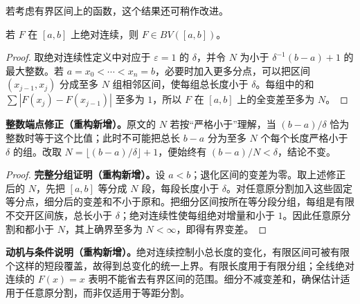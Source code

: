 \documentclass[../../main.tex]{subfiles}%
\begin{document}
若考虑有界区间上的函数，这个结果还可稍作改进。
\begin{lemma}\label{lemma:ch03-ac-implies-bv}
若 $F$ 在 $[a,b]$ 上绝对连续，则 $F\in BV([a,b])$。
\end{lemma}
\begin{proof}
取绝对连续性定义中对应于 $\varepsilon=1$ 的 $\delta$，并令 $N$ 为小于 $\delta^{-1}(b-a)+1$ 的最大整数。若 $a=x_0<\cdots<x_n=b$，必要时加入更多分点，可以把区间 $(x_{j-1},x_j)$ 分成至多 $N$ 组相邻区间，使每组总长度小于 $\delta$。每组中的和 $\sum|F(x_j)-F(x_{j-1})|$ 至多为 $1$，所以 $F$ 在 $[a,b]$ 上的全变差至多为 $N$。
\end{proof}
\begin{remark}
\textbf{整数端点修正（重构新增）。}原文的 $N$ 若按“严格小于”理解，当 $(b-a)/\delta$ 恰为整数时等于这个比值；此时不可能把总长 $b-a$ 分为至多 $N$ 个每个长度严格小于 $\delta$ 的组。改取 $N=\lfloor(b-a)/\delta\rfloor+1$，便始终有 $(b-a)/N<\delta$，结论不变。
\end{remark}
\begin{proof}
\textbf{完整分组证明（重构新增）。}设 $a<b$；退化区间的变差为零。取上述修正后的 $N$，先把 $[a,b]$ 等分成 $N$ 段，每段长度小于 $\delta$。对任意原分割加入这些固定等分点，细分后的变差和不小于原和。把细分区间按所在等分段分组，每组是有限不交开区间族，总长小于 $\delta$；绝对连续性使每组绝对增量和小于 $1$。因此任意原分割和都小于 $N$，其上确界至多为 $N<\infty$，即得有界变差。
\end{proof}
\begin{remark}
\textbf{动机与条件说明（重构新增）。}绝对连续控制小总长度的变化，有限区间可被有限个这样的短段覆盖，故得到总变化的统一上界。有限长度用于有限分组；全线绝对连续的 $F(x)=x$ 表明不能省去有界区间的范围。细分不减变差和，确保估计适用于任意原分割，而非仅适用于等距分割。
\end{remark}
\end{document}
